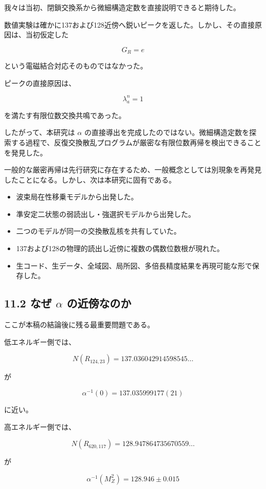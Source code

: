 \documentclass[
  10pt,
  a4paper,
]{article}
\providecommand{\tightlist}{%
  \setlength{\itemsep}{0pt}\setlength{\parskip}{0pt}}
\begin{document}
我々は当初、閉鎖交換系から微細構造定数を直接説明できると期待した。

数値実験は確かに137および128近傍へ鋭いピークを返した。しかし、その直接原因は、当初仮定した

\[
G_R=e
\]

という電磁結合対応そのものではなかった。

ピークの直接原因は、

\[
\lambda_a^n=1
\]

を満たす有限位数交換共鳴であった。

したがって、本研究は \(\alpha\)
の直接導出を完成したのではない。微細構造定数を探索する過程で、反復交換散乱プログラムが厳密な有限位数再帰を検出できることを発見した。

一般的な厳密再帰は先行研究に存在するため、一般概念としては別現象を再発見したことになる。しかし、次は本研究に固有である。

\begin{itemize}
\tightlist
\item
  波束局在性移乗モデルから出発した。
\item
  準安定二状態の弱読出し・強選択モデルから出発した。
\item
  二つのモデルが同一の交換散乱核を共有していた。
\item
  137および128の物理的読出し近傍に複数の偶数位数根が現れた。
\item
  生コード、生データ、全域図、局所図、多倍長精度結果を再現可能な形で保存した。
\end{itemize}

\subsection{\texorpdfstring{11.2 なぜ \(\alpha\)
の近傍なのか}{11.2 なぜ \textbackslash alpha の近傍なのか}}\label{ux306aux305c-alpha-ux306eux8fd1ux508dux306aux306eux304b}

ここが本稿の結論後に残る最重要問題である。

低エネルギー側では、

\[
N(R_{124,23})
=137.036042914598545\ldots
\]

が

\[
\alpha^{-1}(0)
=137.035999177(21)
\]

に近い。

高エネルギー側では、

\[
N(R_{620,117})
=128.947864735670559\ldots
\]

が

\[
\alpha^{-1}(M_Z^2)
=128.946\pm0.015
\]
\end{document}
